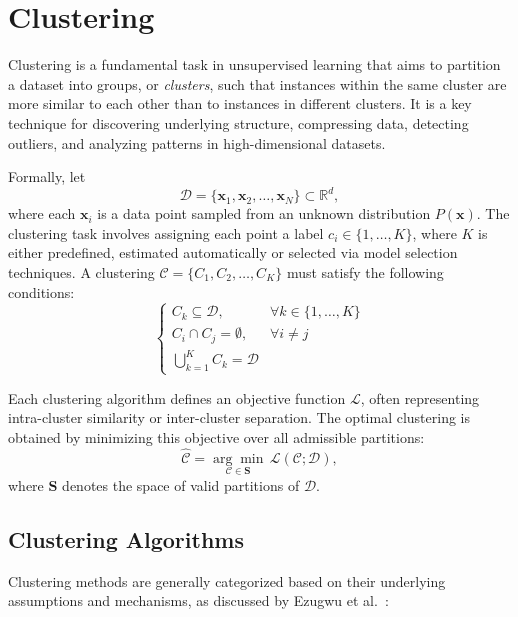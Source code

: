 \section{Clustering}\label{sec:clustering}

Clustering is a fundamental task in unsupervised learning that aims to
partition a dataset into groups, or \textit{clusters}, such that instances
within the same cluster are more similar to each other than to instances in
different clusters. It is a key technique for discovering underlying structure,
compressing data, detecting outliers, and analyzing patterns in
high-dimensional datasets.

Formally, let
\begin{equation}
    \mathcal{D} = \{\mathbf{x}_1, \mathbf{x}_2, \ldots, \mathbf{x}_N\} \subset \mathbb{R}^d,
\end{equation}
where each $\mathbf{x}_i$ is a data point sampled from an unknown distribution
$P(\mathbf{x})$. The clustering task involves assigning each point a label $c_i
    \in \{1, \ldots, K\}$, where $K$ is either predefined, estimated automatically
or selected via model selection techniques.
A clustering $\mathcal{C} = \{C_1, C_2, \ldots, C_K\}$
must satisfy the following conditions:
\begin{equation}
    \begin{cases}
        C_k \subseteq \mathcal{D}, & \forall k \in \{1, \ldots, K\} \\
        C_i \cap C_j = \emptyset,  & \forall i \neq j               \\
        \bigcup_{k=1}^{K} C_k = \mathcal{D}
    \end{cases}
\end{equation}

Each clustering algorithm defines an objective function $\mathcal{L}$, often
representing intra-cluster similarity or inter-cluster separation. The optimal
clustering is obtained by minimizing this objective over all admissible
partitions:
\begin{equation}
    \hat{\mathcal{C}} = \underset{\mathcal{C} \in \mathbf{S}}{\arg\min} \, \mathcal{L}(\mathcal{C}; \mathcal{D}),
\end{equation}
where $\mathbf{S}$ denotes the space of valid partitions of $\mathcal{D}$.

\subsection*{Clustering Algorithms}
Clustering methods are generally categorized based on their underlying
assumptions and mechanisms, as discussed by Ezugwu et
al.~\cite{clustering_survey}:

